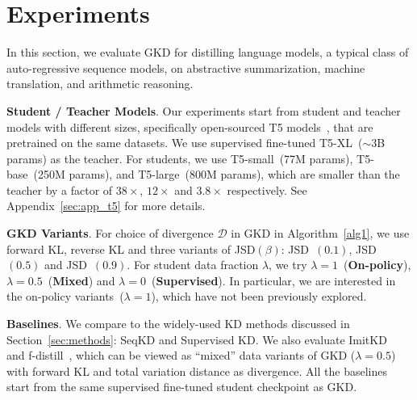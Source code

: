 \documentclass{article} %
\def\eqref#1{equation~\ref{#1}}
\def\D{\mathcal{D}}
\newcommand{\revise}[1]{#1}
\begin{document}
\vspace{-0.2cm}
\section{Experiments}
\vspace{-0.2cm}

\label{sec:res}
In this section, we evaluate GKD for distilling language models, a typical class of auto-regressive sequence models, on abstractive summarization, machine translation, and arithmetic reasoning.  %

\textbf{Student / Teacher Models}. Our experiments start from student and teacher models with different sizes, specifically open-sourced T5 models~\citep{raffel2020exploring}, that are pretrained on the same datasets. We use supervised fine-tuned T5-XL~($\sim3$B params) as the teacher. For students, we use T5-small~(77M params), T5-base~(250M params), and T5-large~(800M params), which are smaller than the teacher by a factor of $38\times$, $12\times$ and $3.8\times$ respectively. See Appendix~\ref{sec:app_t5} for more details. 

\textbf{GKD Variants}. For choice of divergence $\D$ in GKD in Algorithm~\ref{alg1}, we use forward KL, reverse KL and three variants of JSD$(\beta)$: JSD~$(0.1)$, JSD~$(0.5)$ and JSD~$(0.9)$. For student data fraction $\lambda$, we try $\lambda=1$~(\textbf{On-policy}), $\lambda=0.5$~(\textbf{Mixed}) and $\lambda=0$~(\textbf{Supervised}). In particular, we are interested in the on-policy variants~($\lambda=\revise{1}$), which have not been previously explored. 

\textbf{Baselines}. We compare to the widely-used KD methods discussed in Section~\ref{sec:methods}: SeqKD and Supervised KD. We also evaluate ImitKD~\citep{lin2020autoregressive} and f-distill~\citep{wen2023f}, which can be viewed as ``mixed'' data variants of GKD ($\lambda=0.5$) with forward KL and total variation distance as divergence. \revise{All the baselines start from the same supervised fine-tuned student checkpoint as GKD.}
\end{document}
